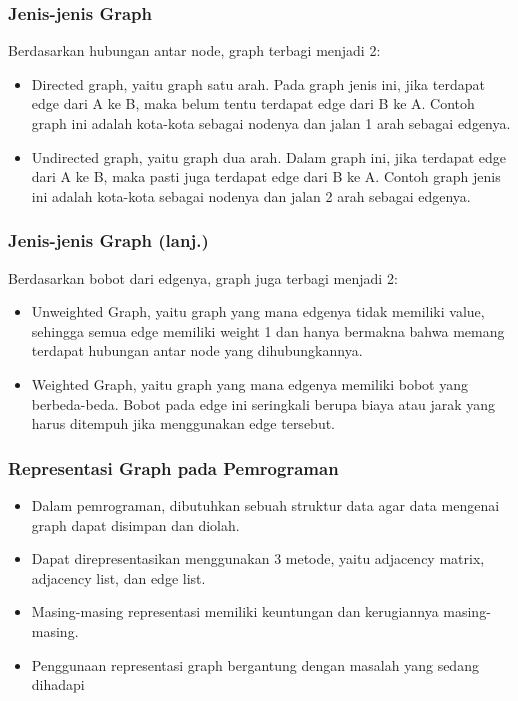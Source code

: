\begin{frame}
\frametitle{Jenis-jenis Graph}
Berdasarkan hubungan antar node, graph terbagi menjadi 2:
\begin{itemize}
  \item Directed graph, yaitu graph satu arah. Pada graph jenis ini, jika terdapat edge dari A ke B, maka belum tentu terdapat edge dari B ke A. Contoh graph ini adalah kota-kota sebagai nodenya dan jalan 1 arah sebagai edgenya.
  \item Undirected graph, yaitu graph dua arah. Dalam graph ini, jika terdapat edge dari A ke B, maka pasti juga terdapat edge dari B ke A. Contoh graph jenis ini adalah kota-kota sebagai nodenya dan jalan 2 arah sebagai edgenya.
\end{itemize}
\end{frame}

\begin{frame}
\frametitle{Jenis-jenis Graph (lanj.)}
Berdasarkan bobot dari edgenya, graph juga terbagi menjadi 2:
\begin{itemize}
  \item Unweighted Graph, yaitu graph yang mana edgenya tidak memiliki value, sehingga semua edge memiliki weight 1 dan hanya bermakna bahwa memang terdapat hubungan antar node yang dihubungkannya.
  \item Weighted Graph, yaitu graph yang mana edgenya memiliki bobot yang berbeda-beda. Bobot pada edge ini seringkali berupa biaya atau jarak yang harus ditempuh jika menggunakan edge tersebut.
\end{itemize}
\end{frame}

\begin{frame}
\frametitle{Representasi Graph pada Pemrograman}

\begin{itemize}
  \item Dalam pemrograman, dibutuhkan sebuah struktur data agar data mengenai graph dapat disimpan dan diolah.
  \item Dapat direpresentasikan menggunakan 3 metode, yaitu adjacency matrix, adjacency list, dan edge list.
  \item Masing-masing representasi memiliki keuntungan dan kerugiannya masing-masing.
  \item Penggunaan representasi graph bergantung dengan masalah yang sedang dihadapi
\end{itemize}
\end{frame}

